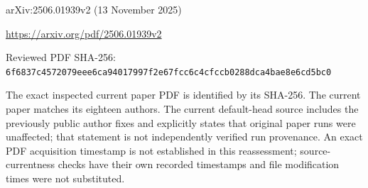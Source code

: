 \documentclass[11pt]{article}
\begin{document}
arXiv:2506.01939v2 (13 November 2025)

\url{https://arxiv.org/pdf/2506.01939v2}

Reviewed PDF SHA-256: \nolinkurl{6f6837c4572079eee6ca94017997f2e67fcc6c4cfccb0288dca4bae8e6cd5bc0}

The exact inspected current paper PDF is identified by its SHA-256. The current paper matches its eighteen authors. The current default-head source includes the previously public author fixes and explicitly states that original paper runs were unaffected; that statement is not independently verified run provenance. An exact PDF acquisition timestamp is not established in this reassessment; source-currentness checks have their own recorded timestamps and file modification times were not substituted.
\end{document}

